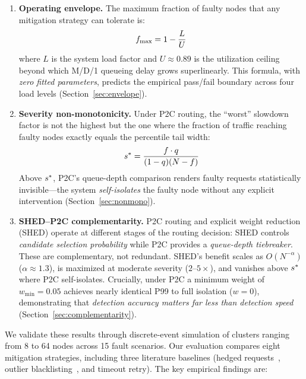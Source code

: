 \begin{enumerate}
\item \textbf{Operating envelope.} The maximum fraction of faulty nodes
  that any mitigation strategy can tolerate is:
  \begin{equation}
    f_{\max} = 1 - \frac{L}{U}
    \label{eq:envelope}
  \end{equation}
  where $L$ is the system load factor and $U \approx 0.89$ is the
  utilization ceiling beyond which M/D/1 queueing delay grows
  superlinearly. This formula, with \emph{zero fitted parameters}, predicts
  the empirical pass/fail boundary across four load levels
  (Section~\ref{sec:envelope}).

\item \textbf{Severity non-monotonicity.} Under P2C routing, the ``worst''
  slowdown factor is not the highest but the one where the fraction of
  traffic reaching faulty nodes exactly equals the percentile tail width:
  \begin{equation}
    s^{*} = \frac{f \cdot q}{(1-q)(N-f)}
    \label{eq:sstar}
  \end{equation}
  Above $s^{*}$, P2C's queue-depth comparison renders faulty requests
  statistically invisible---the system \emph{self-isolates} the faulty
  node without any explicit intervention
  (Section~\ref{sec:nonmono}).

\item \textbf{SHED--P2C complementarity.} P2C routing and explicit weight
  reduction (SHED) operate at different stages of the routing decision:
  SHED controls \emph{candidate selection probability} while P2C provides
  a \emph{queue-depth tiebreaker}. These are complementary, not redundant.
  SHED's benefit scales as $O(N^{-\alpha})$ ($\alpha \approx 1.3$),
  is maximized at moderate severity ($2$--$5\times$), and vanishes above
  $s^{*}$ where P2C self-isolates. Crucially, under P2C a minimum weight
  of $w_{\min} = 0.05$ achieves nearly identical P99 to full isolation
  ($w = 0$), demonstrating that \emph{detection accuracy matters far less
  than detection speed} (Section~\ref{sec:complementarity}).
\end{enumerate}

We validate these results through discrete-event simulation of clusters
ranging from 8 to 64 nodes across 15 fault scenarios. Our evaluation
compares eight mitigation strategies, including three literature baselines
(hedged requests~\cite{dean2013tail}, outlier
blacklisting~\cite{lakshman2010cassandra}, and timeout retry). The key
empirical findings are:


